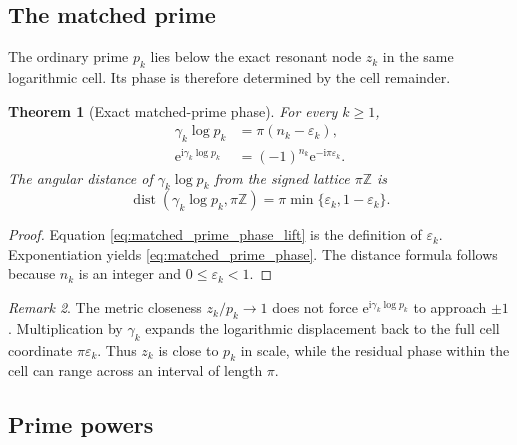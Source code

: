 \documentclass[11pt]{amsart}
\numberwithin{equation}{section}
\theoremstyle{plain}
\newtheorem{theorem}{Theorem}[section]
\theoremstyle{definition}
\theoremstyle{remark}
\newtheorem{remark}[theorem]{Remark}
\newcommand{\e}{\mathrm e}
\newcommand{\ii}{\mathrm i}
\newcommand{\dist}{\operatorname{dist}}
\begin{document}
\subsection{The matched prime}
\label{subsec:matched_prime}

The ordinary prime $p_k$ lies below the exact resonant node $z_k$ in the same
logarithmic cell.  Its phase is therefore determined by the cell remainder.

\begin{theorem}[Exact matched-prime phase]
\label{thm:exact_matched_prime_phase}
For every $k\geq1$,
\begin{align}
 \gamma_k\log p_k
 &=\pi(n_k-\varepsilon_k),
 \label{eq:matched_prime_phase_lift}
 \\
 \e^{\ii\gamma_k\log p_k}
 &=(-1)^{n_k}\e^{-\ii\pi\varepsilon_k}.
 \label{eq:matched_prime_phase}
\end{align}
The angular distance of $\gamma_k\log p_k$ from the signed lattice
$\pi\mathbb Z$ is
\begin{equation}
 \dist(\gamma_k\log p_k,\pi\mathbb Z)
 =\pi\min\{\varepsilon_k,1-\varepsilon_k\}.
 \label{eq:matched_prime_signed_distance}
\end{equation}
\end{theorem}

\begin{proof}
Equation \eqref{eq:matched_prime_phase_lift} is the definition of
$\varepsilon_k$.  Exponentiation yields
\eqref{eq:matched_prime_phase}.  The distance formula follows because
$n_k$ is an integer and $0\leq\varepsilon_k<1$.
\end{proof}

\begin{remark}
\label{rem:metric_closeness_phase_detuning}
The metric closeness $z_k/p_k\to1$ does not force
$\e^{\ii\gamma_k\log p_k}$ to approach $\pm1$.  Multiplication by
$\gamma_k$ expands the logarithmic displacement back to the full cell
coordinate $\pi\varepsilon_k$.  Thus $z_k$ is close to $p_k$ in scale, while
the residual phase within the cell can range across an interval of length
$\pi$.
\end{remark}

\subsection{Prime powers}
\label{subsec:prime_powers}
\end{document}

